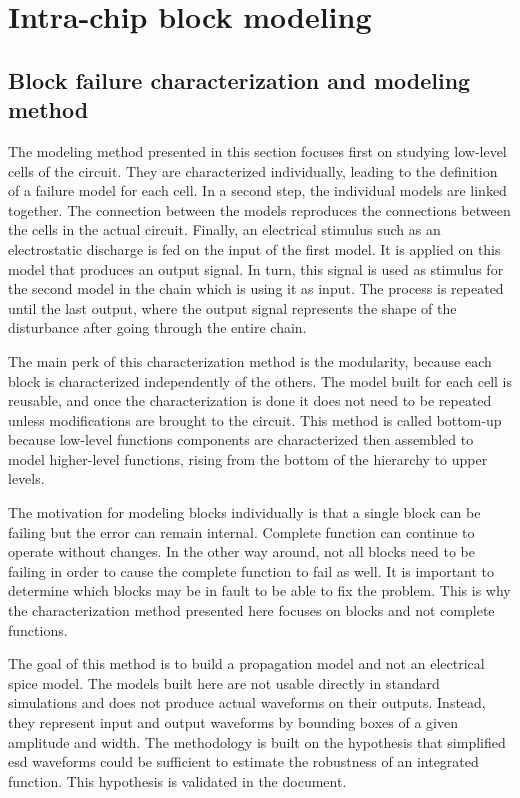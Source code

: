\section{Intra-chip block modeling}
\label{sec:bottom-up-modeling}

\subsection{Block failure characterization and modeling method}
\label{sec:block-failure-cz}

The modeling method presented in this section focuses first on studying low-level cells of the circuit.
They are characterized individually, leading to the definition of a failure model for each cell.
In a second step, the individual models are linked together.
The connection between the models reproduces the connections between the cells in the actual circuit.
Finally, an electrical stimulus such as an electrostatic discharge is fed on the input of the first model.
It is applied on this model that produces an output signal.
In turn, this signal is used as stimulus for the second model in the chain which is using it as input.
The process is repeated until the last output, where the output signal represents the shape of the disturbance after going through the entire chain.

The main perk of this characterization method is the modularity, because each block is characterized independently of the others.
The model built for each cell is reusable, and once the characterization is done it does not need to be repeated unless modifications are brought to the circuit.
This method is called bottom-up because low-level functions components are characterized then assembled to model higher-level functions, rising from the bottom of the hierarchy to upper levels.

The motivation for modeling blocks individually is that a single block can be failing but the error can remain internal.
Complete function can continue to operate without changes.
In the other way around, not all blocks need to be failing in order to cause the complete function to fail as well.
It is important to determine which blocks may be in fault to be able to fix the problem.
This is why the characterization method presented here focuses on blocks and not complete functions.

The goal of this method is to build a propagation model and not an electrical \gls{spice} model.
The models built here are not usable directly in standard simulations and does not produce actual waveforms on their outputs.
Instead, they represent input and output waveforms by bounding boxes of a given amplitude and width.
The methodology is built on the hypothesis that simplified \gls{esd} waveforms could be sufficient to estimate the robustness of an integrated function.
This hypothesis is validated in the document.

